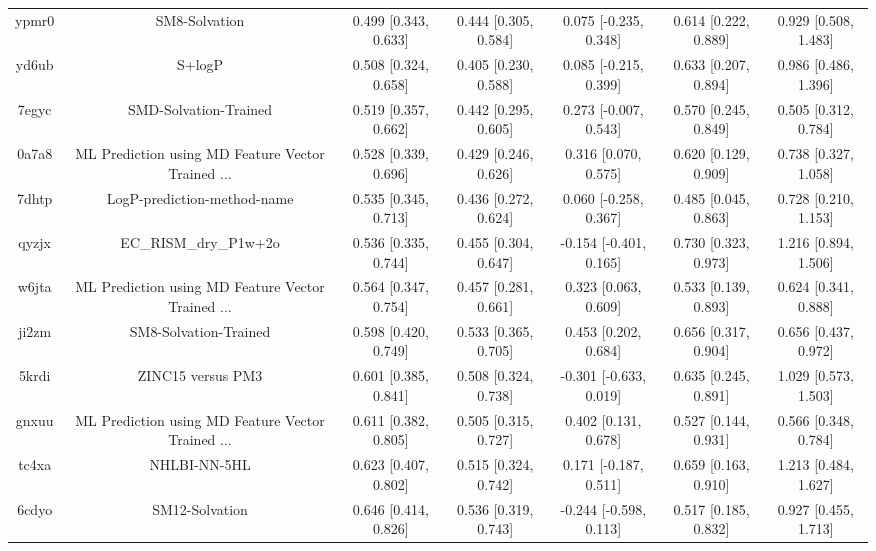 \documentclass{article}
\begin{document}
\begin{center}
\begin{longtable}{|ccccccc|}
 ypmr0 &                                      SM8-Solvation &  0.499 [0.343, 0.633] &  0.444 [0.305, 0.584] &    0.075 [-0.235, 0.348] &  0.614 [0.222, 0.889] &    0.929 [0.508, 1.483] \\
 yd6ub &                                             S+logP &  0.508 [0.324, 0.658] &  0.405 [0.230, 0.588] &    0.085 [-0.215, 0.399] &  0.633 [0.207, 0.894] &    0.986 [0.486, 1.396] \\
 7egyc &                              SMD-Solvation-Trained &  0.519 [0.357, 0.662] &  0.442 [0.295, 0.605] &    0.273 [-0.007, 0.543] &  0.570 [0.245, 0.849] &    0.505 [0.312, 0.784] \\
 0a7a8 &  ML Prediction using MD Feature Vector Trained ... &  0.528 [0.339, 0.696] &  0.429 [0.246, 0.626] &     0.316 [0.070, 0.575] &  0.620 [0.129, 0.909] &    0.738 [0.327, 1.058] \\
 7dhtp &                        LogP-prediction-method-name &  0.535 [0.345, 0.713] &  0.436 [0.272, 0.624] &    0.060 [-0.258, 0.367] &  0.485 [0.045, 0.863] &    0.728 [0.210, 1.153] \\
 qyzjx &                              EC\_RISM\_dry\_P1w+2o &  0.536 [0.335, 0.744] &  0.455 [0.304, 0.647] &   -0.154 [-0.401, 0.165] &  0.730 [0.323, 0.973] &    1.216 [0.894, 1.506] \\
 w6jta &  ML Prediction using MD Feature Vector Trained ... &  0.564 [0.347, 0.754] &  0.457 [0.281, 0.661] &     0.323 [0.063, 0.609] &  0.533 [0.139, 0.893] &    0.624 [0.341, 0.888] \\
 ji2zm &                              SM8-Solvation-Trained &  0.598 [0.420, 0.749] &  0.533 [0.365, 0.705] &     0.453 [0.202, 0.684] &  0.656 [0.317, 0.904] &    0.656 [0.437, 0.972] \\
 5krdi &                                  ZINC15 versus PM3 &  0.601 [0.385, 0.841] &  0.508 [0.324, 0.738] &   -0.301 [-0.633, 0.019] &  0.635 [0.245, 0.891] &    1.029 [0.573, 1.503] \\
 gnxuu &  ML Prediction using MD Feature Vector Trained ... &  0.611 [0.382, 0.805] &  0.505 [0.315, 0.727] &     0.402 [0.131, 0.678] &  0.527 [0.144, 0.931] &    0.566 [0.348, 0.784] \\
 tc4xa &                                       NHLBI-NN-5HL &  0.623 [0.407, 0.802] &  0.515 [0.324, 0.742] &    0.171 [-0.187, 0.511] &  0.659 [0.163, 0.910] &    1.213 [0.484, 1.627] \\
 6cdyo &                                     SM12-Solvation &  0.646 [0.414, 0.826] &  0.536 [0.319, 0.743] &   -0.244 [-0.598, 0.113] &  0.517 [0.185, 0.832] &    0.927 [0.455, 1.713] \\

\end{longtable}
\end{center}
\end{document}
